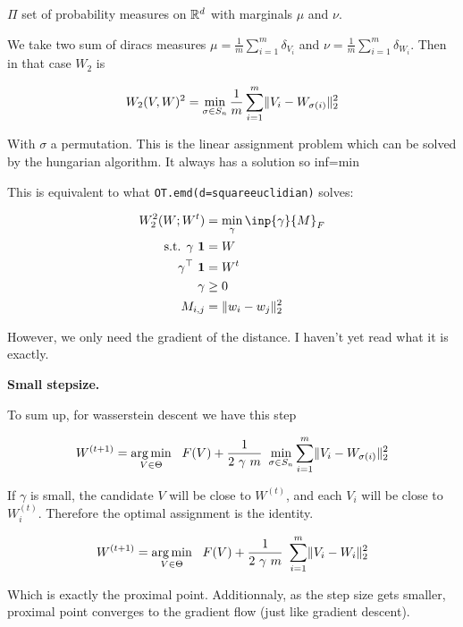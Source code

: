 $\Pi$ set of probability measures on $\mathbb{R}^d$ with marginals $\mu$ and $\nu$.

We take two sum of diracs measures $\mu = \frac{1}{m} \sum_{i=1}^{m} \delta_{V_i}$ and $\nu = \frac{1}{m} \sum_{i=1}^{m} \delta_{W_i}$. Then in that case $W_2$ is

\begin{equation}
	W_2(V, W)^2 = \min_{\sigma \in S_n} \frac{1}{m} \sum_{i=1}^{m} \lVert V_i - W_{\sigma(i)}\rVert^2_2
\end{equation}

With $\sigma$ a permutation. This is the linear assignment problem which can be solved by the hungarian algorithm. It always has a solution so inf=min

This is equivalent to what \texttt{OT.emd(d=squareeuclidian)} solves:

\begin{align}
	W_2^2(W; W^t) &= \min_{\gamma} \inp{\gamma}{M}_F \\
	\text{s.t.  } \gamma ~ \mathbf{1} &= W \\
	\gamma^\top ~ \mathbf{1} &= W^t \\
	\gamma &\geq 0 \\
	M_{i, j} &= \lVert w_i - w_j \rVert^2_2
\end{align}

However, we only need the gradient of the distance. I haven't yet read what it is exactly.

\textbf{Small stepsize.}

To sum up, for wasserstein descent we have this step

\begin{equation}
	W^{(t+1)} = \argmin_{V \in \Theta} \ \  F(V) + \frac{1}{2 ~ \gamma ~ m} ~ \min_{\sigma \in S_n} \sum_{i=1}^{m} \norm{V_i - W_{\sigma(i)}}^2_2
\end{equation}

If $\gamma$ is small, the candidate $V$ will be close to $W^{(t)}$, and each $V_i$ will be close to $W^{(t)}_i$. Therefore the optimal assignment is the identity.

\begin{equation}
	W^{(t+1)} = \argmin_{V \in \Theta} \ \  F(V) + \frac{1}{2 ~ \gamma ~ m} ~ \sum_{i=1}^{m} \norm{V_i - W_i}^2_2
\end{equation}

Which is exactly the proximal point. Additionnaly, as the step size gets smaller, proximal point converges to the gradient flow (just like gradient descent).

